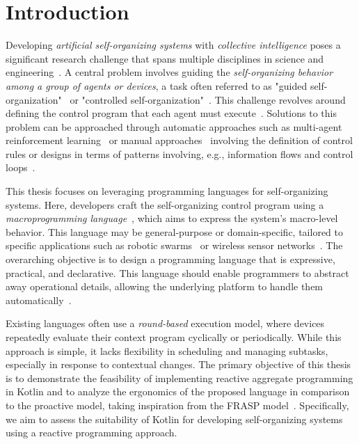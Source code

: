 
\chapter{Introduction}
\label{chap:introduction}

Developing \textit{artificial self-organizing systems} with \textit{collective intelligence} poses a significant research challenge that spans multiple disciplines in science and engineering~\cite{Parunak2015, Gershenson2007, Singh2013, DeNicola2020}. A central problem involves guiding the \textit{self-organizing behavior among a group of agents or devices}, a task often referred to as "guided self-organization"~\cite{Prokopenko2007} or "controlled self-organization"~\cite{Schmeck2010}. This challenge revolves around defining the control program that each agent must execute~\cite{Martius2011}. Solutions to this problem can be approached through automatic approaches such as multi-agent reinforcement learning~\cite{Zhang2021} or manual approaches~\cite{Martius2011} involving the definition of control rules or designs in terms of patterns
involving, e.g., information flows and control loops~\cite{DeWolf2007}.

This thesis focuses on leveraging programming languages for self-organizing systems. Here, developers craft the self-organizing control program using a \textit{macroprogramming language}~\cite{Casadei2023_2, Jnior2022}, which aims to express the system's macro-level behavior. This language may be general-purpose or domain-specific, tailored to specific applications such as robotic swarms~\cite{Brambilla2013} or wireless sensor networks~\cite{Mottola2011}. The overarching objective is to design a programming language that is expressive, practical, and declarative. This language should enable programmers to abstract away operational details, allowing the underlying platform to handle them automatically~\cite{Noor2019, Casadei2020_2}.

Existing languages often use a \textit{round-based} execution model, where devices repeatedly evaluate their context program cyclically or periodically. While this approach is simple, it lacks flexibility in scheduling and managing subtasks, especially in response to contextual changes. The primary objective of this thesis is to demonstrate the feasibility of implementing reactive aggregate programming in Kotlin and to analyze the ergonomics of the proposed language in comparison to the proactive model, taking inspiration from the FRASP model~\cite{Casadei2023}. Specifically, we aim to assess the suitability of Kotlin for developing self-organizing systems using a reactive programming approach.

